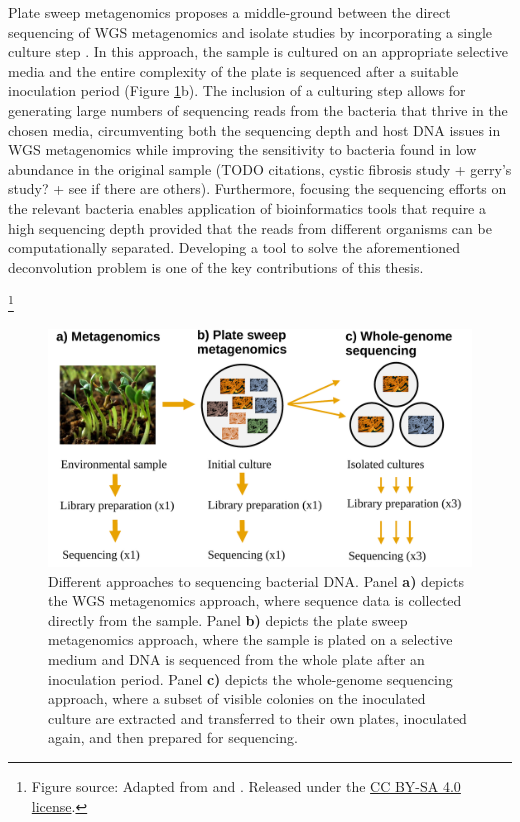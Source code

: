 \documentclass[officiallayout]{tktla}
\let\svthefootnote\thefootnote
\begin{document}
Plate sweep metagenomics proposes a middle-ground between the direct
sequencing of WGS metagenomics and isolate studies by incorporating a
single culture step \citep{maklin_high-resolution_2021}. In this
approach, the sample is cultured on an appropriate selective media and
the entire complexity of the plate is sequenced after a suitable
inoculation period (Figure
\ref{fig:microbiome-sampling-methods}b). The inclusion of a culturing
step allows for generating large numbers of sequencing reads from the
bacteria that thrive in the chosen media, circumventing both the
sequencing depth and host DNA issues in WGS metagenomics while
improving the sensitivity to bacteria found in low abundance in the
original sample (TODO citations, cystic fibrosis study + gerry's
study? + see if there are others). Furthermore, focusing the
sequencing efforts on the relevant bacteria enables application of
bioinformatics tools that require a high sequencing depth provided
that the reads from different organisms can be computationally
separated. Developing a tool to solve the aforementioned deconvolution
problem is one of the key contributions of this thesis.

\noindent\let\thefootnote\relax\footnote{Figure source: Adapted from \cite{praveera_fenugreek-sprouts} and \cite{niaid_escherichia-coli}. Released under the \href{https://creativecommons.org/licenses/by-sa/4.0}{CC BY-SA 4.0 license}.}
\addtocounter{footnote}{-1}\let\thefootnote\svthefootnote
\begin{figure}[!ht]
  \label{fig:microbiome-sampling-methods}
    \centering
    \includegraphics[width=\textwidth,keepaspectratio]{img/sampling/microbiome_sampling_methods.pdf}
    \caption{Different approaches to sequencing bacterial DNA. Panel
      \textbf{a)} depicts the WGS metagenomics approach, where
      sequence data is collected directly from the sample. Panel
      \textbf{b)} depicts the plate sweep metagenomics approach, where
      the sample is plated on a selective medium and DNA is sequenced
      from the whole plate after an inoculation period. Panel
      \textbf{c)} depicts the whole-genome sequencing approach, where
      a subset of visible colonies on the inoculated culture are
      extracted and transferred to their own plates, inoculated again,
      and then prepared for sequencing.}
\end{figure}
\end{document}
